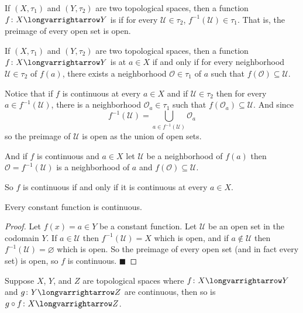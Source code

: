 \documentclass[10pt]{article}
\def\qed{\hskip1cm\penalty-100\hbox{}\hfill$\blacksquare$}
\def\mU{\mathcal{U}}
\def\mO{\mathcal{O}}
\def\longto{\longvarrightarrow}
\begin{document}
\begin{defn*}

    If $(X,\tau_1)$ and $(Y,\tau_2)$ are two topological spaces, then a function $f\colon X\longvarrightarrow Y$ is  if for every $\mU\in\tau_2$, $f^{-1}(\mU)\in\tau_1$.
    That is, the preimage of every open set is open.

\end{defn*}

\begin{defn*}

    If $(X,\tau_1)$ and $(Y,\tau_2)$ are two topological spaces, then a function $f\colon X\longvarrightarrow Y$ is  at $a\in X$ if and only if for every neighborhood $\mU\in\tau_2$ of
    $f(a)$, there exists a neighborhood $\mO\in\tau_1$ of $a$ such that $f(\mO)\subseteq\mU$.

\end{defn*}

Notice that if $f$ is continuous at every $a\in X$ and if $\mU\in\tau_2$ then for every $a\in f^{-1}(\mU)$, there is a neighborhood $\mO_a\in\tau_1$ such that $f(\mO_a)\subseteq\mU$.
And since
\[ f^{-1}(\mU) = \bigcup_{a\in f^{-1}(\mU)} \mO_a \]
so the preimage of $\mU$ is open as the union of open sets.

And if $f$ is continuous and $a\in X$ let $\mU$ be a neighborhood of $f(a)$ then $\mO=f^{-1}(\mU)$ is a neighborhood of $a$ and $f(\mO)\subseteq\mU$.

So $f$ is continuous if and only if it is continuous at every $a\in X$.

\begin{prop*}

    Every constant function is continuous.

\end{prop*}


\begin{proof}

    Let $f(x)=a\in Y$ be a constant function.
    Let $\mU$ be an open set in the codomain $Y$.
    If $a\in\mU$ then $f^{-1}(\mU)=X$ which is open, and if $a\notin\mU$ then $f^{-1}(\mU)=\varnothing$ which is open.
    So the preimage of every open set (and in fact every set) is open, so $f$ is continuous.
    \qed

\end{proof}

\begin{prop*}

    Suppose $X$, $Y$, and $Z$ are topological spaces where $f\colon X\longto Y$ and $g\colon Y\longto Z$ are continuous, then so is $g\circ f\colon X\longto Z$.

\end{prop*}
\end{document}
